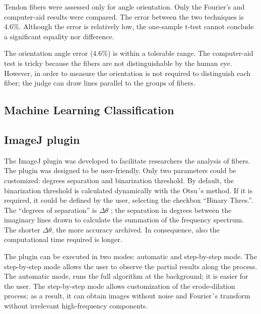 \documentclass[12pt,a4paper]{article}
\begin{document}
Tendon fibers were assessed only for angle orientation. Only the Fourier’s and computer-aid results were compared. The error between the two techniques is 4.6\%. Although the error is relatively low, the one-sample t-test cannot conclude a significant equality nor difference.

The orientation angle error (4.6\%) is within a tolerable range. The computer-aid test is tricky because the fibers are not distinguishable by the human eye. However, in order to measure the orientation is not required to distinguish each fiber; the judge can draw lines parallel to the groups of fibers.

\subsection{Machine Learning Classification}


\subsection{ImageJ plugin}

The ImageJ plugin was developed to facilitate researchers the analysis of fibers. The plugin was designed to be user-friendly. Only two parameters could be customized: degrees separation and binarization threshold. By default, the binarization threshold is calculated dynamically with the Otsu´s method. If it is required, it could be defined by the user, selecting the checkbox “Binary Thres.”. The “degrees of separation” is $\Delta\theta$ ; the separation in degrees between the imaginary lines drawn to calculate the summation of  the frequency spectrum. The shorter $\Delta\theta$, the more accuracy archived.  In consequence, also the computational time required is longer.

The plugin can be executed in two modes: automatic and step-by-step mode. The step-by-step mode allows the user to observe the partial results along the process. The automatic mode, runs the full algorithm at the background; it is easier for the user. The step-by-step mode allows customization of the erode-dilation process; as a result, it can obtain images without noise and Fourier´s transform without irrelevant high-frequency components. 
\end{document}
